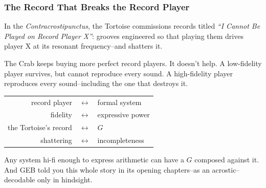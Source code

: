 \documentclass[aspectratio=169]{beamer}
\begin{document}
\begin{frame}[fragile]
  \frametitle{The Record That Breaks the Record Player}

  In the \textit{Contracrostipunctus}, the Tortoise commissions
  records titled \textit{``I Cannot Be Played on Record Player X''}:
  grooves engineered so that playing them drives player X at its
  resonant frequency--and shatters it.

  \pause
  \vspace{\fill}

  The Crab keeps buying more perfect record players. It doesn't help.
  A low-fidelity player survives, but cannot reproduce every sound. A
  high-fidelity player reproduces every sound--including the one that
  destroys it.

  \pause
  \vspace{\fill}

  \begin{center}
  \begin{tabular}{r c l}
    record player & $\longleftrightarrow$ & formal system \\
    fidelity & $\longleftrightarrow$ & expressive power \\
    the Tortoise's record & $\longleftrightarrow$ & $G$ \\
    shattering & $\longleftrightarrow$ & incompleteness \\
  \end{tabular}
  \end{center}

  \pause
  \vspace{\fill}

  Any system hi-fi enough to express arithmetic can have a $G$
  composed against it. And GEB told you this whole story in its
  opening chapters--as an acrostic--decodable only in hindsight.
\end{frame}



\end{document}
